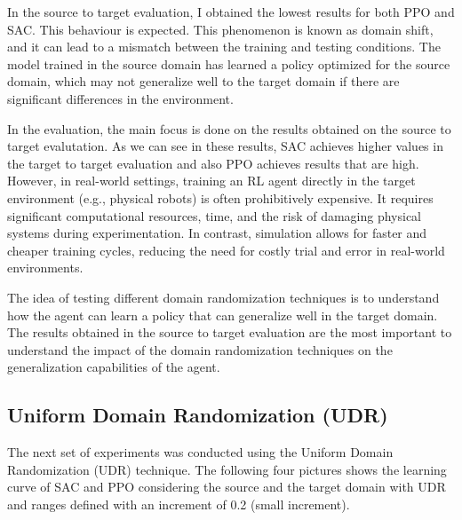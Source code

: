 \documentclass[12pt]{article}
\begin{document}
In the source to target evaluation, I obtained the lowest results for both PPO and SAC. This behaviour is expected. This phenomenon is known as domain shift, and it can lead to a mismatch between the training and testing conditions. The model trained in the source domain has learned a policy optimized for the source domain, which may not generalize well to the target domain if there are significant differences in the environment. 

In the evaluation, the main focus is done on the results obtained on the source to target evalutation. As we can see in these results, SAC achieves higher values in the target to target evaluation and also PPO achieves results that are high. However, in real-world settings, training an RL agent directly in the target environment (e.g., physical robots) is often prohibitively expensive. It requires significant computational resources, time, and the risk of damaging physical systems during experimentation. In contrast, simulation allows for faster and cheaper training cycles, reducing the need for costly trial and error in real-world environments. 

The idea of testing different domain randomization techniques is to understand how the agent can learn a policy that can generalize well in the target domain. The results obtained in the source to target evaluation are the most important to understand the impact of the domain randomization techniques on the generalization capabilities of the agent.

\subsection{Uniform Domain Randomization (UDR)}

The next set of experiments was conducted using the Uniform Domain Randomization (UDR) technique. The following four pictures shows the learning curve of SAC and PPO considering the source and the target domain with UDR and ranges defined with an increment of 0.2 (small increment).
\end{document}
